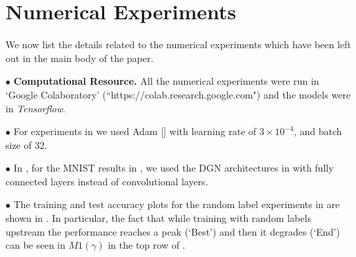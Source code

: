 \newpage
\appendix

\section{Numerical Experiments}
We now list the details related to the numerical experiments which have been left out in the main body of the paper.

\indent \quad $\bullet$ \textbf{Computational Resource.} All the numerical experiments were run in `Google Colaboratory' (``https://colab.research.google.com") and the models were in \emph{Tensorflow}.



\indent \quad $\bullet$ For experiments in  we used Adam [] with learning rate of $3\times 10^{-4}$, and batch size of 32.


\indent \quad $\bullet$ In , for the MNIST results in , we used the DGN architectures in  with fully connected layers instead of convolutional layers. 

\indent \quad $\bullet$ The training and test accuracy plots for the random label experiments in  are shown in . In particular, the fact that while training with random labels upstream the performance reaches a peak (`Best') and then it degrades (`End') can be seen in $M1(\gamma)$ in the top row of . 

